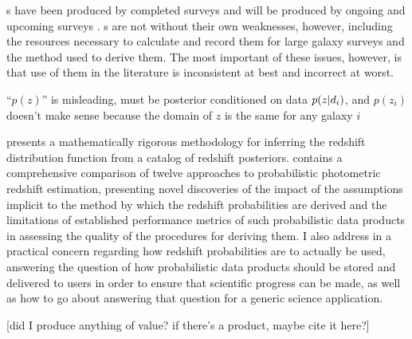 \Pzpdf s have been produced by completed surveys \citep{Hildebrandt2012, Sheldon2012} and will be produced by ongoing and upcoming surveys \citep{LSSTScienceCollaboration2009, CarrascoKind2014a, Bonnett2015, Masters2015}.  
\Pzpdf s are not without their own weaknesses, however, including the resources necessary to calculate and record them for large galaxy surveys \citep{CarrascoKind2014} and the method used to derive them.  
The most important of these issues, however, is that use of them in the literature is inconsistent at best and incorrect at worst.  

\clearpage

``$p(z)$'' is misleading, must be posterior conditioned on data $p(z \vert d_{i})$, and $p(z_{i})$ doesn't make sense because the domain of $z$ is the same for any galaxy $i$




 presents a mathematically rigorous methodology for inferring the redshift distribution function from a catalog of redshift posteriors.
 contains a comprehensive comparison of twelve approaches to probabilistic photometric redshift estimation, presenting novel discoveries of the impact of the assumptions implicit to the method by which the redshift probabilities are derived and the limitations of established performance metrics of such probabilistic data products in assessing the quality of the procedures for deriving them.
I also address in  a practical concern regarding how redshift probabilities are to actually be used, answering the question of how probabilistic data products should be stored and delivered to users in order to ensure that scientific progress can be made, as well as how to go about answering that question for a generic science application.

[did I produce anything of value? if there's a product, maybe cite it here?]

